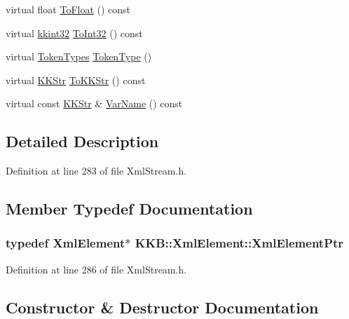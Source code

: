 \begin{DoxyCompactItemize}
virtual float \hyperlink{class_k_k_b_1_1_xml_element_aa728687ed43e76d45d029dfc14e14e95}{To\+Float} () const 
\item 
virtual \hyperlink{namespace_k_k_b_a8fa4952cc84fda1de4bec1fbdd8d5b1b}{kkint32} \hyperlink{class_k_k_b_1_1_xml_element_aac7463c7b305f66b5157f424a0a76363}{To\+Int32} () const 
\item 
virtual \hyperlink{class_k_k_b_1_1_xml_token_a18b6e90c919f4b92e3b024f50f247f62}{Token\+Types} \hyperlink{class_k_k_b_1_1_xml_element_afcd7a4617fb5fdb8e434003b8aebcb3d}{Token\+Type} ()
\item 
virtual \hyperlink{class_k_k_b_1_1_k_k_str}{K\+K\+Str} \hyperlink{class_k_k_b_1_1_xml_element_a3028fc03b79509e6378749f6a8b426b9}{To\+K\+K\+Str} () const 
\item 
virtual const \hyperlink{class_k_k_b_1_1_k_k_str}{K\+K\+Str} \& \hyperlink{class_k_k_b_1_1_xml_element_aef57cf00be66a3a387ce849b35125f51}{Var\+Name} () const 
\end{DoxyCompactItemize}


\subsection{Detailed Description}


Definition at line 283 of file Xml\+Stream.\+h.



\subsection{Member Typedef Documentation}
\subsubsection[{\texorpdfstring{Xml\+Element\+Ptr}{XmlElementPtr}}]{\setlength{\rightskip}{0pt plus 5cm}typedef {\bf Xml\+Element}$\ast$ {\bf K\+K\+B\+::\+Xml\+Element\+::\+Xml\+Element\+Ptr}}\hypertarget{class_k_k_b_1_1_xml_element_ac1957d6e4bdc44e6b876b44cee0941be}{}\label{class_k_k_b_1_1_xml_element_ac1957d6e4bdc44e6b876b44cee0941be}


Definition at line 286 of file Xml\+Stream.\+h.



\subsection{Constructor \& Destructor Documentation}
